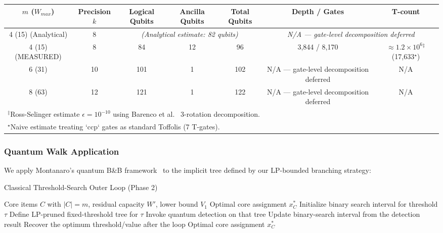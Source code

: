 \documentclass[conference]{IEEEtran} \IEEEoverridecommandlockouts
\begin{document}
\begin{table}[ht]
\label{tab:h_resources}
\begin{tabular}{ccccccc}
\hline\hline
$m$ ($W_{max}$) & Precision $k$ & Logical Qubits & Ancilla Qubits & Total Qubits & Depth / Gates & T-count \\
\hline
4 (15) (Analytical) & 8 & \multicolumn{3}{c}{\textit{(Analytical estimate: 82 qubits)}} & \multicolumn{2}{c}{\textit{N/A --- gate-level decomposition deferred}} \\
4 (15) (MEASURED) & 8 & 84 & 12 & 96 & 3,844 / 8,170 & $\approx 1.2\times 10^6$$^\ddagger$ (17,633$^\star$) \\
6 (31) & 10 & 101 & 1 & 102 & N/A --- gate-level decomposition deferred & N/A \\
8 (63) & 12 & 121 & 1 & 122 & N/A --- gate-level decomposition deferred & N/A \\
\hline\hline
\multicolumn{7}{l}{\footnotesize $^\ddagger$Ross-Selinger estimate $\epsilon=10^{-10}$ using Barenco et al.~\cite{barenco1995} 3-rotation decomposition.} \\
\multicolumn{7}{l}{\footnotesize $^\star$Naive estimate treating `ccp` gates as standard Toffolis (7 T-gates).} \\
\end{tabular}
\end{table}

\subsubsection{Quantum Walk Application}

We apply Montanaro's quantum B\&B framework~\cite{ref24} to the implicit tree defined by our LP-bounded branching strategy:

\begin{algorithm}[h]
\caption{Classical Threshold-Search Outer Loop (Phase 2)}
\label{alg:qbb}
\begin{algorithmic}[1]
\REQUIRE Core items $C$ with $|C| = m$, residual capacity $W'$, lower bound $V_1$
\ENSURE Optimal core assignment $x^*_C$
\STATE Initialize binary search interval for threshold $\tau$
\STATE Define LP-pruned fixed-threshold tree for $\tau$
\STATE Invoke quantum detection on that tree
\STATE Update binary-search interval from the detection result
\ENDWHILE
\STATE Recover the optimum threshold/value after the loop
\RETURN Optimal core assignment $x^*_C$
\end{algorithmic}
\end{algorithm}
\end{document}
